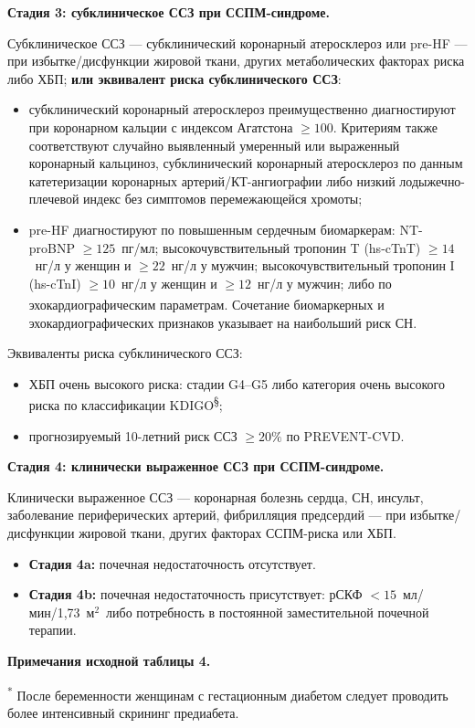 \documentclass[11pt,a4paper]{article}
\newcommand{\heading}[1]{\par\medskip\textbf{#1}\par}
\newcommand{\unitgfr}{мл/мин/1,73~м$^2$}
\begin{document}
\heading{Стадия 3: субклиническое ССЗ при ССПМ-синдроме.} Субклиническое ССЗ --- субклинический коронарный атеросклероз или pre-HF --- при избытке/дисфункции жировой ткани, других метаболических факторах риска либо ХБП; \textbf{или эквивалент риска субклинического ССЗ}:
\begin{itemize}
\item субклинический коронарный атеросклероз преимущественно диагностируют при коронарном кальции с индексом Агатстона $\geq100$. Критериям также соответствуют случайно выявленный умеренный или выраженный коронарный кальциноз, субклинический коронарный атеросклероз по данным катетеризации коронарных артерий/КТ-ангиографии либо низкий лодыжечно-плечевой индекс без симптомов перемежающейся хромоты;
\item pre-HF диагностируют по повышенным сердечным биомаркерам: NT-proBNP $\geq125$~пг/мл; высокочувствительный тропонин T (hs-cTnT) $\geq14$~нг/л у женщин и $\geq22$~нг/л у мужчин; высокочувствительный тропонин I (hs-cTnI) $\geq10$~нг/л у женщин и $\geq12$~нг/л у мужчин; либо по эхокардиографическим параметрам\textsuperscript{\ddag}. Сочетание биомаркерных и эхокардиографических признаков указывает на наибольший риск СН.
\end{itemize}
Эквиваленты риска субклинического ССЗ:
\begin{itemize}
\item ХБП очень высокого риска: стадии G4--G5 либо категория очень высокого риска по классификации KDIGO\textsuperscript{§};
\item прогнозируемый 10-летний риск ССЗ $\geq20\%$ по PREVENT-CVD.
\end{itemize}

\heading{Стадия 4: клинически выраженное ССЗ при ССПМ-синдроме.} Клинически выраженное ССЗ --- коронарная болезнь сердца, СН, инсульт, заболевание периферических артерий, фибрилляция предсердий --- при избытке/дисфункции жировой ткани, других факторах ССПМ-риска или ХБП.
\begin{itemize}
\item \textbf{Стадия 4a:} почечная недостаточность отсутствует.
\item \textbf{Стадия 4b:} почечная недостаточность присутствует: рСКФ $<15$~\unitgfr\ либо потребность в постоянной заместительной почечной терапии.
\end{itemize}

\textbf{Примечания исходной таблицы 4.}

\textsuperscript{*} После беременности женщинам с гестационным диабетом следует проводить более интенсивный скрининг предиабета.
\end{document}
